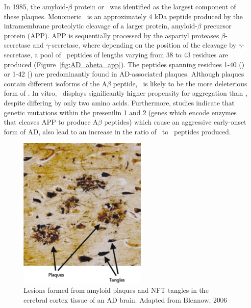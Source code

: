 In 1985, the amyloid-$\beta$ protein or \abeta\ was identified as the largest component of these plaques.\cite{Masters:1985wb}
Monomeric \abeta\ is an approximately 4 kDa peptide produced by the intramembrane proteolytic cleavage of a larger protein, amyloid-$\beta$ precursor protein (APP).\cite{Hardy:2002dh}
APP is sequentially processed by the aspartyl proteases $\beta$-secretase and $\gamma$-secretase, where depending on the position of the cleavage by $\gamma$-secretase, a pool of \abeta\ peptides of lengths varying from 38 to 43 residues are produced (Figure~\ref{fig:AD_abeta_app}).\cite{Gandy:2005dd} The peptides spanning residues 1-40 (\abetaforty) or 1-42 (\abetafortytwo) are predominantly found in AD-associated plaques.\cite{Golde:2000vg,Holtzman:2011gi} Although plaques contain different isoforms of the A$\beta$ peptide, \abetafortytwo\ is likely to be the more deleterious form of \abeta. In vitro, \abetafortytwo\ displays significantly higher propensity for aggregation than \abetaforty, despite differing by only two amino acids.\cite{Barrow:1992vz,Jarrett:1993ti,ElAgnaf:2000vr} Furthermore,  studies indicate that genetic mutations within the presenilin 1 and 2 (genes which encode enzymes that cleaves APP to produce A$\beta$ peptides) which cause an aggressive early-onset form of AD, also lead to an increase in the ratio of \abetafortytwo\ to \abetaforty\ peptides produced.\cite{Hardy:1997tu,KumarSingh:2006kc,Bentahir:2006ih}

\begin{figure}
 \centering
 \includegraphics[width=2.5in]{figures/introduction/AD_tissue_pathology.pdf}
 \caption[AD tissue pathology]{Lesions formed from amyloid plaques and NFT tangles in the cerebral cortex tissue of an AD brain. Adapted from Blennow, 2006}
 \label{fig:AD_tissue_pathology}
\end{figure}

